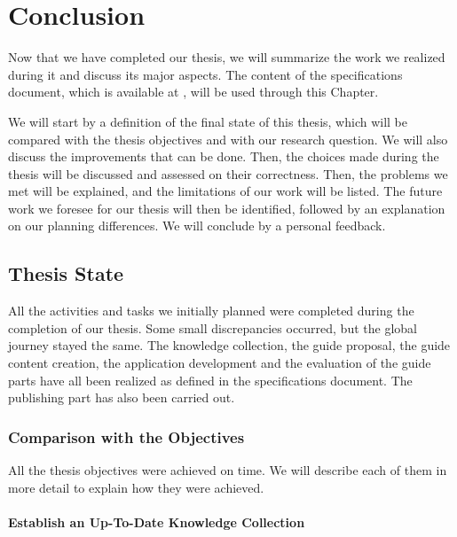 \chapter{Conclusion}
\label{chap:conclusions}

Now that we have completed our thesis, we will summarize the work we realized during it and discuss its major aspects. The content of the specifications document, which is available at , will be used through this Chapter.

We will start by a definition of the final state of this thesis, which will be compared with the thesis objectives and with our research question. We will also discuss the improvements that can be done. Then, the choices made during the thesis will be discussed and assessed on their correctness. Then, the problems we met will be explained, and the limitations of our work will be listed. The future work we foresee for our thesis will then be identified, followed by an explanation on our planning differences. We will conclude by a personal feedback.

\minitoc

\newpage

\section{Thesis State}
\label{sec:conclusions_state}

All the activities and tasks we initially planned were completed during the completion of our thesis. Some small discrepancies occurred, but the global journey stayed the same. The knowledge collection, the guide proposal, the guide content creation, the application development and the evaluation of the guide parts have all been realized as defined in the specifications document. The publishing part has also been carried out.

\subsection{Comparison with the Objectives}
\label{subsec:conclusions_state_objectives}

All the thesis objectives were achieved on time. We will describe each of them in more detail to explain how they were achieved.

\subsubsection{Establish an Up-To-Date Knowledge Collection}

